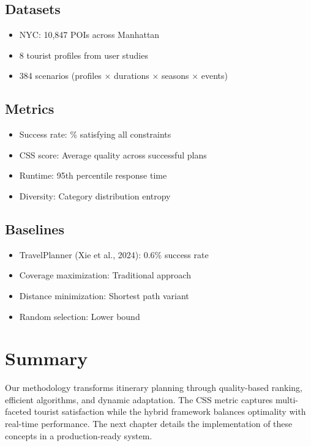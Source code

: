 \subsection{Datasets}
\begin{itemize}
    \item NYC: 10,847 POIs across Manhattan
    \item 8 tourist profiles from user studies
    \item 384 scenarios (profiles × durations × seasons × events)
\end{itemize}

\subsection{Metrics}
\begin{itemize}
    \item Success rate: \% satisfying all constraints
    \item CSS score: Average quality across successful plans
    \item Runtime: 95th percentile response time
    \item Diversity: Category distribution entropy
\end{itemize}

\subsection{Baselines}
\begin{itemize}
    \item TravelPlanner (Xie et al., 2024): 0.6\% success rate
    \item Coverage maximization: Traditional approach
    \item Distance minimization: Shortest path variant
    \item Random selection: Lower bound
\end{itemize}

\section{Summary}

Our methodology transforms itinerary planning through quality-based ranking, efficient algorithms, and dynamic adaptation. The CSS metric captures multi-faceted tourist satisfaction while the hybrid framework balances optimality with real-time performance. The next chapter details the implementation of these concepts in a production-ready system.